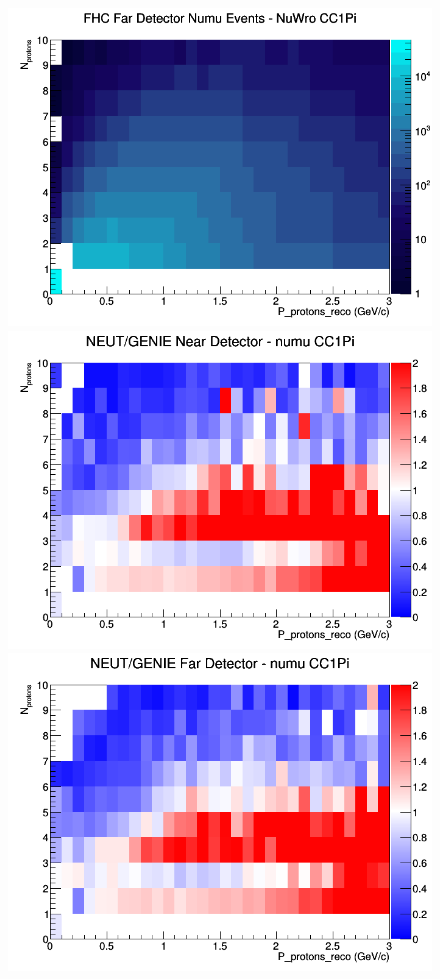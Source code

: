 \begin{figure}[h]
\endminipage
{}
\includegraphics[width=\linewidth]{eff_N_P/LAr/protons/CC1Pi_FHC_FD_numu_N_P_NuWro.png}
\endminipage
\newline
{}
\includegraphics[width=\linewidth]{eff_N_P/LAr/protons/ratios/CC1Pi_NEUT_GENIE_numu_near_N_P.png}
\endminipage
{}
\includegraphics[width=\linewidth]{eff_N_P/LAr/protons/ratios/CC1Pi_NEUT_GENIE_numu_far_N_P.png}

\end{figure}
